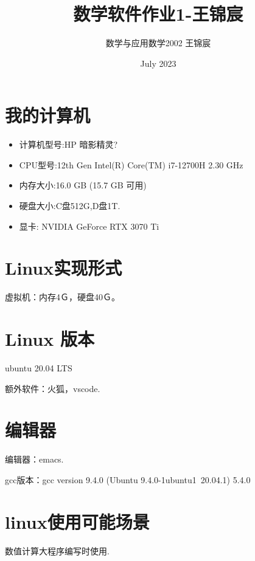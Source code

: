 \documentclass[UTF8]{ctexart}
\title{数学软件作业1-王锦宸}
\author{数学与应用数学2002 王锦宸 }
\date{July 2023}
\begin{document}
\maketitle

\section{我的计算机}

\begin{itemize}
    \item 计算机型号:HP 暗影精灵?
    \item CPU型号:12th Gen Intel(R) Core(TM) i7-12700H   2.30 GHz
    \item 内存大小:16.0 GB (15.7 GB 可用)
    \item 硬盘大小:C盘512G,D盘1T.
    \item 显卡: NVIDIA GeForce RTX 3070 Ti
\end{itemize}

\section{Linux实现形式}

虚拟机：内存4Ｇ，硬盘40Ｇ。

\section{Linux 版本}

ubuntu 20.04 LTS\par
额外软件：火狐，vscode.

\section{编辑器}

编辑器：emacs.\par
gcc版本：gcc version 9.4.0 (Ubuntu 9.4.0-1ubuntu1~20.04.1) 5.4.0

\section{linux使用可能场景}

数值计算大程序编写时使用.
\end{document}
